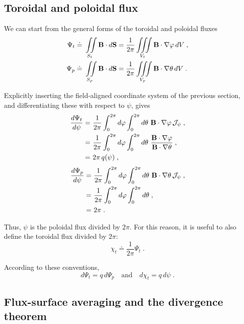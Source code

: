 \subsection{Toroidal and poloidal flux}

We can start from the general forms of the toroidal and poloidal 
fluxes \cite{dhaeseleer:1991}
%
\begin{align}
\Psi_t \doteq &~\iint\limits_{S_t} \mathbf{B} \cdot d{\bf S} 
  = \frac{1}{2\pi} \iiint\limits_{V_t} \mathbf{B} \cdot \nabla\varphi \, dV \; , \\
\Psi_p \doteq &~\iint\limits_{S_p} \mathbf{B} \cdot d{\bf S} 
  = \frac{1}{2\pi} \iiint\limits_{V_p} \mathbf{B} \cdot \nabla\theta \, dV \; .
\end{align}

\noindent
Explicitly inserting the field-aligned coordinate system of the 
previous section, and differentiating these with respect to $\psi$, 
gives
%
\begin{align}
\frac{d\Psi_t}{d\psi} 
  = &~\frac{1}{2\pi} 
  \int_0^{2\pi} d\varphi \int_0^{2\pi} d\theta 
   \,\, \mathbf{B}\cdot\nabla\varphi \, {\mathcal J}_\psi \; , \\
  = &~\frac{1}{2\pi} 
  \int_0^{2\pi} d\varphi \int_0^{2\pi} d\theta 
  \,\, \frac{\mathbf{B}\cdot\nabla\varphi}{\mathbf{B}\cdot\nabla\theta} \; , \\
  = &~2 \pi \, q(\psi) \; ,
\end{align}
\begin{align}
\frac{d\Psi_p}{d\psi} 
  = &~\frac{1}{2\pi} 
  \int_0^{2\pi} d\varphi \int_0^{2\pi} d\theta 
  \,\, \mathbf{B}\cdot\nabla\theta \, {\mathcal J}_\psi \; , \\
  = &~\frac{1}{2\pi} 
  \int_0^{2\pi} d\varphi \int_0^{2\pi} d\theta \; , \\
  = &~2 \pi \; .
\end{align}

\noindent
Thus, $\psi$ is the poloidal flux divided by $2\pi$.  For this reason, 
it is useful to also define the toroidal flux divided by $2\pi$:
%
\begin{equation}
\chi_t \doteq \frac{1}{2\pi} \Psi_t\; .
\end{equation}

\noindent
According to these conventions, 
%
\begin{equation}
d\Psi_t = q \, d\Psi_p \quad \mbox{and} \quad
d\chi_t = q \, d\psi \; .
\end{equation}

\subsection{Flux-surface averaging and the divergence theorem}
\label{sec.fluxave}

